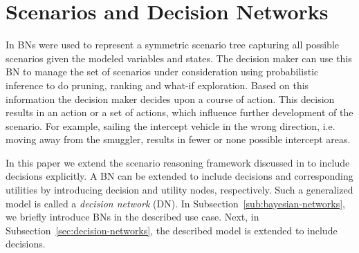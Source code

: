 \documentclass[conference]{IEEEtran}
\begin{document}
\section{Scenarios and Decision Networks}\label{sec:scenarios-decision-network}

In \cite{conrado14if} BNs were used to represent a symmetric scenario tree capturing all possible scenarios given the modeled variables and states. The decision maker can use this BN to manage the set of scenarios under consideration using probabilistic inference to do pruning, ranking and what-if exploration. Based on this information the decision maker decides upon a course of action. %
This decision results in an action or a set of actions, which  influence further development of the scenario. For example, sailing the intercept vehicle in the wrong direction, i.e. moving away from the smuggler, results in fewer or none possible intercept areas. 

In this paper we extend the scenario reasoning framework discussed in \cite{conrado14if} to include decisions explicitly. A BN can be extended to include decisions and corresponding utilities by introducing decision and utility nodes, respectively. Such a generalized model is called a {\em decision network} (DN). In Subsection~\ref{sub:bayesian-networks}, we briefly introduce BNs in the described use case. Next, in Subsection~\ref{sec:decision-networks}, the described model is extended to include decisions.

\begin{figure}
\begin{center}
 \qquad
{}
 \caption{}
\end{center}
\end{figure}
\end{document}
